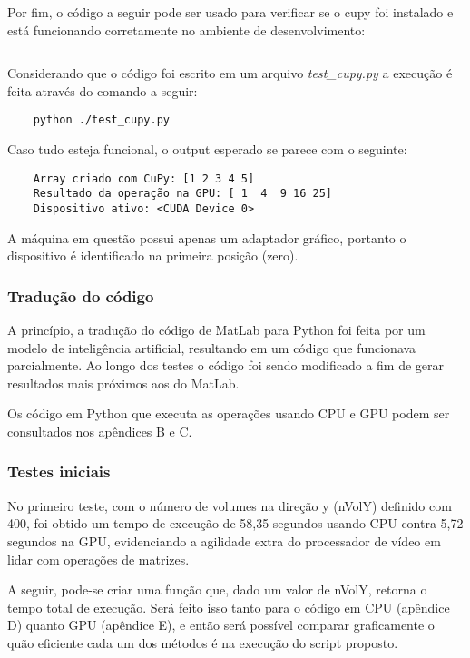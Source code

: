 \documentclass[12pt,a4paper]{article}
\begin{document}
Por fim, o código a seguir pode ser usado para verificar se o cupy foi instalado e está funcionando corretamente no ambiente de desenvolvimento:

\inputminted{python}{cfd_on_gpu/teste_cupy.py}

Considerando que o código foi escrito em um arquivo \emph{test\_cupy.py} a execução é feita através do comando a seguir:

\begin{verbatim}
    python ./test_cupy.py
\end{verbatim}

Caso tudo esteja funcional, o output esperado se parece com o seguinte:

\begin{verbatim}
    Array criado com CuPy: [1 2 3 4 5]
    Resultado da operação na GPU: [ 1  4  9 16 25]
    Dispositivo ativo: <CUDA Device 0>
\end{verbatim}

A máquina em questão possui apenas um adaptador gráfico, portanto o dispositivo é identificado na primeira posição (zero).


\subsubsection{Tradução do código}

A princípio, a tradução do código de MatLab para Python foi feita por um modelo de inteligência artificial, resultando em um código que funcionava parcialmente. Ao longo dos testes o código foi sendo modificado a fim de gerar resultados mais próximos aos do MatLab.

Os código em Python que executa as operações usando CPU e GPU podem ser consultados nos apêndices B e C.

\subsubsection{Testes iniciais}

No primeiro teste, com o número de volumes na direção y (nVolY) definido com 400, foi obtido um tempo de execução de 58,35 segundos usando CPU contra 5,72 segundos na GPU, evidenciando a agilidade extra do processador de vídeo em lidar com operações de matrizes.

A seguir, pode-se criar uma função que, dado um valor de nVolY, retorna o tempo total de execução. Será feito isso tanto para o código em CPU (apêndice D) quanto GPU (apêndice E), e então será possível comparar graficamente o quão eficiente cada um dos métodos é na execução do script proposto.
\end{document}
